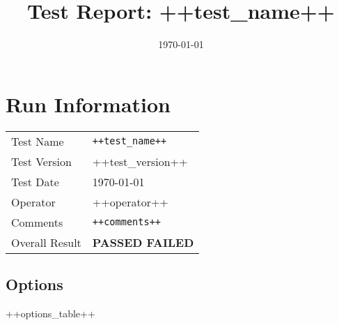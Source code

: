 \documentclass{article}
\title{Test Report: ++test_name++ }
\author{}
\date{\today}
\newcommand{\passed}[1]{%
    \ifboolexpr{ test {\ifnumcomp{#1}{=}{1}}  }
      {PASSED}
      {FAILED}
      }
\begin{document}
\maketitle

\section{Run Information}

\begin{tabular}{p{2.5cm}p{5cm}}
  Test Name      & \texttt{++test_name++}       \\
  Test Version   & ++test_version++             \\
  Test Date      & \today                       \\
  Operator       & ++operator++                 \\
  Comments       & \texttt{++comments++}        \\
  Overall Result & \textbf{\passed{++result++}} \\
\end{tabular}

\subsection*{Options}

++options_table++
\end{document}
